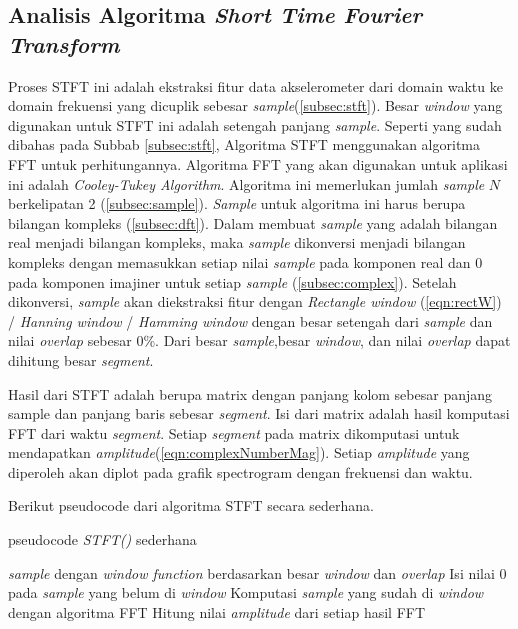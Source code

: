 \subsection{Analisis Algoritma {\it Short Time Fourier Transform}}
Proses STFT ini adalah ekstraksi fitur data akselerometer dari domain waktu ke domain frekuensi yang dicuplik sebesar {\it sample}(\ref{subsec:stft}). Besar {\it window} yang digunakan untuk STFT ini adalah setengah panjang {\it sample}. Seperti yang sudah dibahas pada Subbab \ref{subsec:stft}, Algoritma STFT menggunakan algoritma FFT untuk perhitungannya. Algoritma FFT yang akan digunakan untuk aplikasi ini adalah {\it Cooley-Tukey Algorithm}. Algoritma ini memerlukan jumlah {\it sample} $N$ berkelipatan 2 (\ref{subsec:sample}). {\it Sample} untuk algoritma ini harus berupa bilangan kompleks (\ref{subsec:dft}). Dalam membuat {\it sample} yang adalah bilangan real menjadi bilangan kompleks, maka {\it sample} dikonversi menjadi bilangan kompleks dengan memasukkan setiap nilai {\it sample} pada komponen real dan 0 pada komponen imajiner untuk setiap {\it sample} (\ref{subsec:complex}). Setelah dikonversi, {\it sample} akan diekstraksi fitur dengan {\it Rectangle window} (\ref{eqn:rectW}) / {\it Hanning window} / {\it Hamming window} dengan besar setengah dari {\it sample} dan nilai {\it overlap} sebesar 0\%. Dari besar {\it sample},besar {\it window}, dan nilai {\it overlap} dapat dihitung besar {\it segment}. 

\newpage
Hasil dari STFT adalah berupa matrix dengan panjang kolom sebesar panjang sample dan panjang baris sebesar {\it segment}. Isi dari matrix adalah hasil komputasi FFT dari waktu {\it segment}. Setiap {\it segment} pada matrix dikomputasi untuk mendapatkan {\it amplitude}(\ref{eqn:complexNumberMag}). Setiap {\it amplitude} yang diperoleh akan diplot pada grafik spectrogram dengan frekuensi dan waktu. 

Berikut pseudocode dari algoritma STFT secara sederhana.
\begin{algorithm}[htbp]
\label{stftSederhana}
		\caption{pseudocode {\it STFT()} sederhana}
		\begin{algorithmic}[1]
				 {\it sample} dengan {\it window function} berdasarkan besar {\it window} dan {\it overlap}
				\State Isi nilai 0 pada {\it sample} yang belum di {\it window}
				\State Komputasi {\it sample} yang sudah di {\it window} dengan algoritma FFT
				\State Hitung nilai {\it amplitude} dari setiap hasil FFT
			\EndWhile
		\EndFunction
	\end{algorithmic}
	\end{algorithm} 



